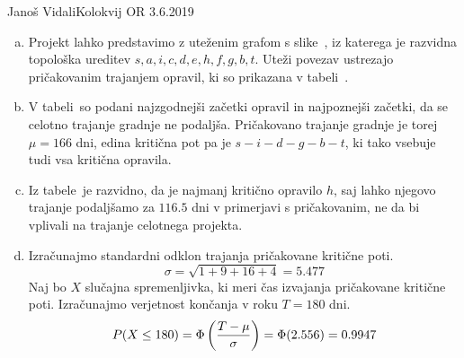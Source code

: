 \begin{naloga}{Janoš Vidali}{Kolokvij OR 3.6.2019}
\begin{odgovor}
\begin{enumerate}[(a)]
\item Projekt lahko predstavimo z uteženim grafom s slike~\fig,
iz katerega je razvidna topološka ureditev $s, a, i, c, d, e, h, f, g, b, t$.
Uteži povezav ustrezajo pričakovanim trajanjem opravil,
ki so prikazana v tabeli~.

\item V tabeli~
so podani najzgodnejši začetki opravil in najpoznejši začetki,
da se celotno trajanje gradnje ne podaljša.
Pričakovano trajanje gradnje je torej $\mu = 166$ dni,
edina kritična pot pa je $s - i - d - g - b - t$,
ki tako vsebuje tudi vsa kritična opravila.

\item Iz tabele~ je razvidno,
da je najmanj kritično opravilo $h$,
saj lahko njegovo trajanje
podaljšamo za $116.5$ dni v primerjavi s pričakovanim,
ne da bi vplivali na trajanje celotnega projekta.

\item Izračunajmo standardni odklon trajanja pričakovane kritične poti.
$$
\sigma = \sqrt{1 + 9 + 16 + 4} = 5.477
$$
Naj bo $X$ slučajna spremenljivka,
ki meri čas izvajanja pričakovane kritične poti.
Izračunajmo verjetnost končanja v roku $T = 180$ dni.
$$
P(X \le 180) = \Phi\left({T - \mu \over \sigma}\right) = \Phi(2.556) = 0.9947
$$
\end{enumerate}
%
\begin{slika}
\makebox[\textwidth][c]{
\pgfslika
}
\end{slika}
%
\begin{tabela}
\end{tabela}
\end{odgovor}
\end{naloga}
